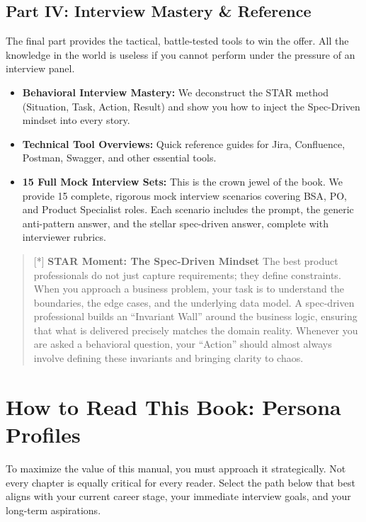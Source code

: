 \subsection{Part IV: Interview Mastery \&
Reference}\label{part-iv-interview-mastery-reference}

The final part provides the tactical, battle-tested tools to win the
offer. All the knowledge in the world is useless if you cannot perform
under the pressure of an interview panel.

\begin{itemize}
\tightlist
\item
  \textbf{Behavioral Interview Mastery:} We deconstruct the STAR method
  (Situation, Task, Action, Result) and show you how to inject the
  Spec-Driven mindset into every story.
\item
  \textbf{Technical Tool Overviews:} Quick reference guides for Jira,
  Confluence, Postman, Swagger, and other essential tools.
\item
  \textbf{15 Full Mock Interview Sets:} This is the crown jewel of the
  book. We provide 15 complete, rigorous mock interview scenarios
  covering BSA, PO, and Product Specialist roles. Each scenario includes
  the prompt, the generic anti-pattern answer, and the stellar
  spec-driven answer, complete with interviewer rubrics.
\end{itemize}

\begin{quote}
{[}*{]} \textbf{STAR Moment: The Spec-Driven Mindset} The best product
professionals do not just capture requirements; they define constraints.
When you approach a business problem, your task is to understand the
boundaries, the edge cases, and the underlying data model. A spec-driven
professional builds an ``Invariant Wall'' around the business logic,
ensuring that what is delivered precisely matches the domain reality.
Whenever you are asked a behavioral question, your ``Action'' should
almost always involve defining these invariants and bringing clarity to
chaos.
\end{quote}

\section{How to Read This Book: Persona
Profiles}\label{how-to-read-this-book-persona-profiles}

To maximize the value of this manual, you must approach it
strategically. Not every chapter is equally critical for every reader.
Select the path below that best aligns with your current career stage,
your immediate interview goals, and your long-term aspirations.

